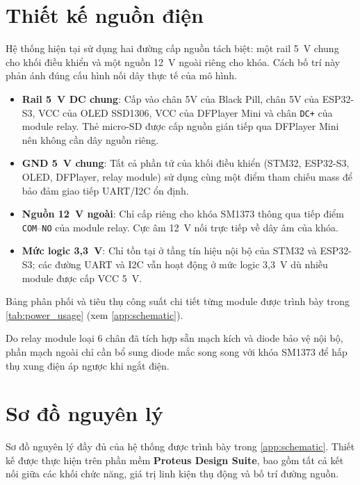 \section{Thiết kế nguồn điện}
\label{sec:power}

Hệ thống hiện tại sử dụng hai đường cấp nguồn tách biệt: một rail 5~V chung cho khối điều khiển và một nguồn 12~V ngoài riêng cho khóa. Cách bố trí này phản ánh đúng cấu hình nối dây thực tế của mô hình.

\begin{itemize}
  \item \textbf{Rail 5~V DC chung}: Cấp vào chân 5V của Black Pill, chân 5V của ESP32-S3, VCC của OLED SSD1306, VCC của DFPlayer Mini và chân \texttt{DC+} của module relay. Thẻ micro-SD được cấp nguồn gián tiếp qua DFPlayer Mini nên không cần dây nguồn riêng.
  \item \textbf{GND 5~V chung}: Tất cả phần tử của khối điều khiển (STM32, ESP32-S3, OLED, DFPlayer, relay module) sử dụng cùng một điểm tham chiếu mass để bảo đảm giao tiếp UART/I2C ổn định.
  \item \textbf{Nguồn 12~V ngoài}: Chỉ cấp riêng cho khóa SM1373 thông qua tiếp điểm \texttt{COM}--\texttt{NO} của module relay. Cực âm 12~V nối trực tiếp về dây âm của khóa.
  \item \textbf{Mức logic 3{,}3~V}: Chỉ tồn tại ở tầng tín hiệu nội bộ của STM32 và ESP32-S3; các đường UART và I2C vẫn hoạt động ở mức logic 3{,}3~V dù nhiều module được cấp VCC 5~V.
\end{itemize}

Bảng phân phối và tiêu thụ công suất chi tiết từng module được trình bày trong \cref{tab:power_usage} (xem \cref{app:schematic}).

Do relay module loại 6 chân đã tích hợp sẵn mạch kích và diode bảo vệ nội bộ, phần mạch ngoài chỉ cần bổ sung diode mắc song song với khóa SM1373 để hấp thụ xung điện áp ngược khi ngắt điện.

\section{Sơ đồ nguyên lý}
\label{sec:schematic}

Sơ đồ nguyên lý đầy đủ của hệ thống được trình bày trong \cref{app:schematic}. Thiết kế được thực hiện trên phần mềm \textbf{Proteus Design Suite}, bao gồm tất cả kết nối giữa các khối chức năng, giá trị linh kiện thụ động và bố trí đường nguồn.

